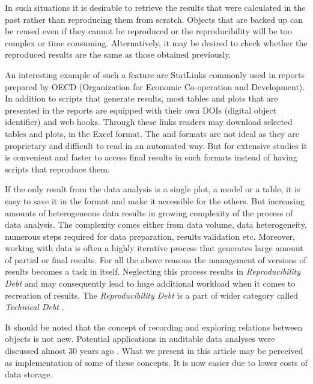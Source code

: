 \documentclass[nojss]{jss}\usepackage[]{graphicx}\usepackage[]{color}
\begin{document}
In such situations it is desirable to retrieve the results that were calculated in the past rather than reproducing them from scratch. Objects that are backed up can be reused even if they cannot be reproduced or the reproducibility will be too complex or time consuming. Alternatively, it may be desired to check whether the reproduced results are the same as those obtained previously.

An interesting example of such a feature are StatLinks \citep[see][]{statlink} commonly used in reports prepared by OECD (Organization for Economic Co-operation and Development). In addition to scripts that generate results, most tables and plots that are presented in the reports are equipped with their own DOIs (digital object identifier) and web hooks. Through these links readers may download selected tables and plots, in the Excel format. 
The  and  formats are not ideal as they are proprietary and difficult to read in an automated way. But for extensive studies it is convenient and faster to access final results in such formats instead of having scripts that reproduce them.

If the only result from the data analysis is a single plot, a model or a table, it is easy to save it in the  format and make it accessible for the others. But increasing amounts of heterogeneous data results in growing complexity of the process of data analysis. The complexity comes either from data volume, data heterogeneity, numerous steps required for data preparation, results validation etc. Moreover, working with data is often a highly iterative process that generates large amount of partial or final results. For all the above reasons the management of versions of results becomes a task in itself. Neglecting this process results in \textit{Reproducibility Debt} and may consequently lead to huge additional workload when it comes to recreation of results. The \textit{Reproducibility Debt} is a part of wider category called \textit{Technical Debt} \citep[see][]{TechnicalDebt}.

It should be noted that the concept of recording and exploring relations between objects is not new. Potential applications in auditable data analyses were  discussed almost 30 years ago \citep[see][]{Auditing}. What we present in this article may be perceived as implementation of some of these concepts. It is now easier due to lower costs of data storage.
\end{document}
